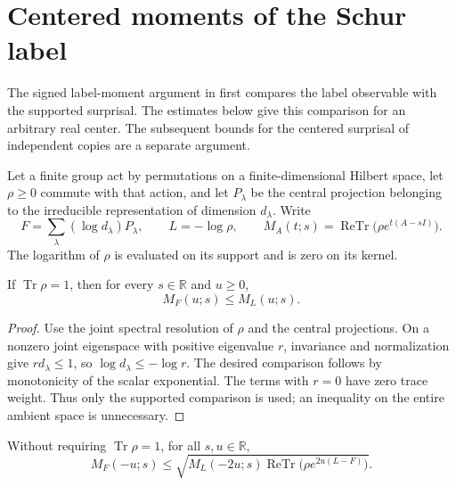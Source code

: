 \section{Centered moments of the Schur label}
\label{sec:schur-label-moments}

The signed label-moment argument in
\cite[Section~7, lines~227--237]{OpenAI2026AreaLaw} first compares the label
observable with the supported surprisal. The estimates below give this
comparison for an arbitrary real center. The subsequent bounds for the
centered surprisal of independent copies are a separate argument.

Let a finite group act by permutations on a finite-dimensional Hilbert space,
let $\rho\ge0$ commute with that action, and let $P_\lambda$ be the central
projection belonging to the irreducible representation of dimension $d_\lambda$.
Write
\[
 F=\sum_\lambda (\log d_\lambda)P_\lambda,
 \qquad L=-\log\rho,
 \qquad M_A(t;s)=\operatorname{ReTr}\bigl(\rho e^{t(A-sI)}\bigr).
\]
The logarithm of $\rho$ is evaluated on its support and is zero on its kernel.

\begin{theorem}
\label{thm:schur-label-positive-centered}
\leanok
If $\operatorname{Tr}\rho=1$, then for every $s\in\mathbb R$ and $u\ge0$,
\[
 M_F(u;s)\le M_L(u;s).
\]
\end{theorem}

\begin{proof}
\leanok
Use the joint spectral resolution of $\rho$ and the central projections.
On a nonzero joint eigenspace with positive eigenvalue $r$, invariance and
normalization give $r d_\lambda\le1$, so $\log d_\lambda\le-\log r$.
The desired comparison follows by monotonicity of the scalar exponential.
The terms with $r=0$ have zero trace weight. Thus only the supported
comparison is used; an inequality on the entire ambient space is unnecessary.
\end{proof}

\begin{theorem}
\label{thm:schur-label-negative-centered}
\leanok
Without requiring $\operatorname{Tr}\rho=1$, for all $s,u\in\mathbb R$,
\[
 M_F(-u;s)\le
 \sqrt{M_L(-2u;s)\operatorname{ReTr}\bigl(\rho e^{2u(L-F)}\bigr)}.
\]
\end{theorem}

